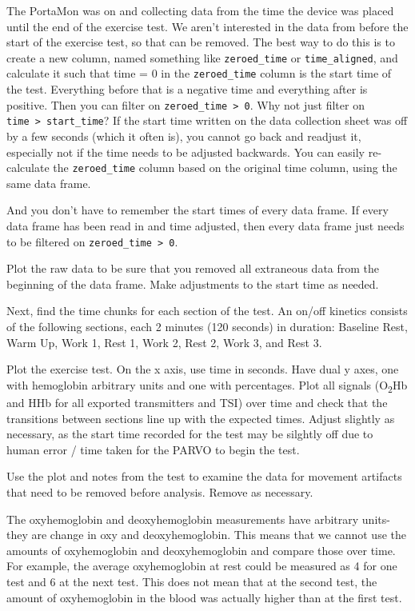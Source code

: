 \documentclass[
]{book}
\begin{document}
The PortaMon was on and collecting data from the time the device was placed until the end of the exercise test. We aren't interested in the data from before the start of the exercise test, so that can be removed. The best way to do this is to create a new column, named something like \texttt{zeroed\_time} or \texttt{time\_aligned}, and calculate it such that time = 0 in the \texttt{zeroed\_time} column is the start time of the test. Everything before that is a negative time and everything after is positive. Then you can filter on \texttt{zeroed\_time\ \textgreater{}\ 0}. Why not just filter on \texttt{time\ \textgreater{}\ start\_time}? If the start time written on the data collection sheet was off by a few seconds (which it often is), you cannot go back and readjust it, especially not if the time needs to be adjusted backwards. You can easily re-calculate the \texttt{zeroed\_time} column based on the original time column, using the same data frame.

And you don't have to remember the start times of every data frame. If every data frame has been read in and time adjusted, then every data frame just needs to be filtered on \texttt{zeroed\_time\ \textgreater{}\ 0}.

Plot the raw data to be sure that you removed all extraneous data from the beginning of the data frame. Make adjustments to the start time as needed.

Next, find the time chunks for each section of the test. An on/off kinetics consists of the following sections, each 2 minutes (120 seconds) in duration: Baseline Rest, Warm Up, Work 1, Rest 1, Work 2, Rest 2, Work 3, and Rest 3.

Plot the exercise test. On the x axis, use time in seconds. Have dual y axes, one with hemoglobin arbitrary units and one with percentages. Plot all signals (O\textsubscript{2}Hb and HHb for all exported transmitters and TSI) over time and check that the transitions between sections line up with the expected times. Adjust slightly as necessary, as the start time recorded for the test may be silghtly off due to human error / time taken for the PARVO to begin the test.

Use the plot and notes from the test to examine the data for movement artifacts that need to be removed before analysis. Remove as necessary.

The oxyhemoglobin and deoxyhemoglobin measurements have arbitrary units- they are change in oxy and deoxyhemoglobin. This means that we cannot use the amounts of oxyhemoglobin and deoxyhemoglobin and compare those over time. For example, the average oxyhemoglobin at rest could be measured as 4 for one test and 6 at the next test. This does not mean that at the second test, the amount of oxyhemoglobin in the blood was actually higher than at the first test.
\end{document}
